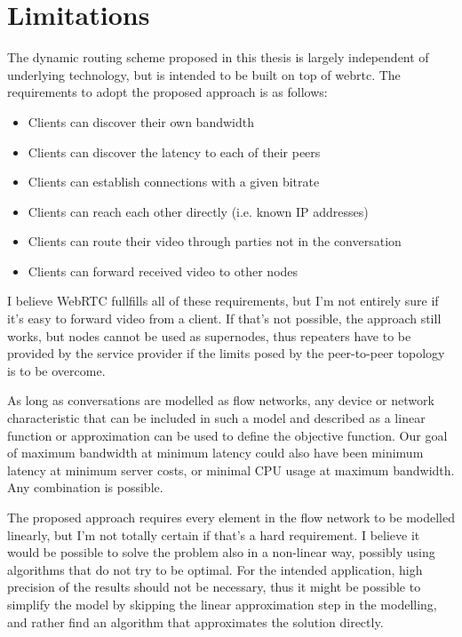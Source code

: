 \section{Limitations}

The dynamic routing scheme proposed in this thesis is largely independent of underlying technology, but is intended to be built on top of \gls{webrtc}. The requirements to adopt the proposed approach is as follows:

\begin{itemize}
    \item Clients can discover their own bandwidth
    \item Clients can discover the latency to each of their peers
    \item Clients can establish connections with a given bitrate
    \item Clients can reach each other directly (i.e. known IP addresses)
    \item Clients can route their video through parties not in the conversation
    \item Clients can forward received video to other nodes
\end{itemize}

I believe WebRTC fullfills all of these requirements, but I'm not entirely sure if it's easy to forward video from a client. If that's not possible, the approach still works, but nodes cannot be used as supernodes, thus repeaters have to be provided by the service provider if the limits posed by the peer-to-peer topology is to be overcome.

As long as conversations are modelled as flow networks, any device or network characteristic that can be included in such a model and described as a linear function or approximation can be used to define the objective function. Our goal of maximum bandwidth at minimum latency could also have been minimum latency at minimum server costs, or minimal CPU usage at maximum bandwidth. Any combination is possible.

The proposed approach requires every element in the flow network to be modelled linearly, but I'm not totally certain if that's a hard requirement. I believe it would be possible to solve the problem also in a non-linear way, possibly using algorithms that do not try to be optimal. For the intended application, high precision of the results should not be necessary, thus it might be possible to simplify the model by skipping the linear approximation step in the modelling, and rather find an algorithm that approximates the solution directly.



